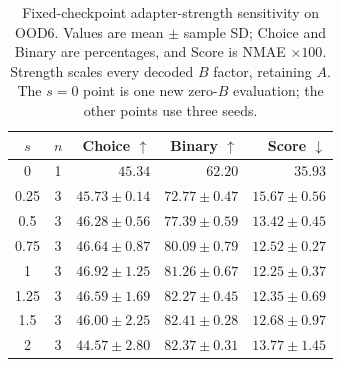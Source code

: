 \begin{table}[t]
\centering
\footnotesize
\setlength{\tabcolsep}{3pt}
\caption{Fixed-checkpoint adapter-strength sensitivity on OOD6. Values are mean $\pm$ sample SD; Choice and Binary are percentages, and Score is NMAE $\times100$. Strength scales every decoded $B$ factor, retaining $A$. The $s=0$ point is one new zero-$B$ evaluation; the other points use three seeds.}
\label{tab:adapter-strength-ood6}
\begin{tabular}{ccrrr}
\toprule
$s$ & $n$ & Choice $\uparrow$ & Binary $\uparrow$ & Score $\downarrow$ \\
\midrule
0 & 1 & $45.34$ & $62.20$ & $35.93$ \\
0.25 & 3 & $45.73 \pm 0.14$ & $72.77 \pm 0.47$ & $15.67 \pm 0.56$ \\
0.5 & 3 & $46.28 \pm 0.56$ & $77.39 \pm 0.59$ & $13.42 \pm 0.45$ \\
0.75 & 3 & $46.64 \pm 0.87$ & $80.09 \pm 0.79$ & $12.52 \pm 0.27$ \\
1 & 3 & $46.92 \pm 1.25$ & $81.26 \pm 0.67$ & $12.25 \pm 0.37$ \\
1.25 & 3 & $46.59 \pm 1.69$ & $82.27 \pm 0.45$ & $12.35 \pm 0.69$ \\
1.5 & 3 & $46.00 \pm 2.25$ & $82.41 \pm 0.28$ & $12.68 \pm 0.97$ \\
2 & 3 & $44.57 \pm 2.80$ & $82.37 \pm 0.31$ & $13.77 \pm 1.45$ \\
\bottomrule
\end{tabular}
\end{table}

